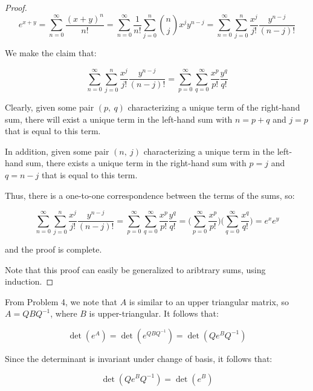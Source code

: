 \documentclass[10pt, oneside]{article}
\begin{document}
    \begin{proof}
      $$e^{x + y} = \displaystyle\sum_{n = 0}^{\infty} \frac{(x + y)^n}{n!} = \displaystyle\sum_{n = 0}^{\infty} \frac{1}{n!} \displaystyle\sum_{j = 0}^{n} {n \choose j} x^{j} y^{n - j} =
      \displaystyle\sum_{n = 0}^{\infty} \displaystyle\sum_{j = 0}^{n} \frac{x^j}{j!} \frac{y^{n - j}}{(n - j)!}$$

      We make the claim that:

      $$\displaystyle\sum_{n = 0}^{\infty} \displaystyle\sum_{j = 0}^{n} \frac{x^j}{j!} \frac{y^{n - j}}{(n - j)!} = \displaystyle\sum_{p = 0}^{\infty} \displaystyle\sum_{q = 0}^{\infty} \frac{x^p}{p!} \frac{y^q}{q!}$$

      Clearly, given some pair $(p, \ q)$ characterizing a unique term of the right-hand sum, there will exist a unique term in the left-hand sum with $n = p + q$ and $j = p$ that is equal to this term.
      \newline

      In addition, given some pair $(n, \ j)$ characterizing a unique term in the left-hand sum, there exists a unique term in the right-hand sum with $p = j$ and $q = n - j$ that is equal to this term.
      \newline

      Thus, there is a one-to-one correspondence between the terms of the sums, so:

      $$\displaystyle\sum_{n = 0}^{\infty} \displaystyle\sum_{j = 0}^{n} \frac{x^j}{j!} \frac{y^{n - j}}{(n - j)!} = \displaystyle\sum_{p = 0}^{\infty} \displaystyle\sum_{q = 0}^{\infty} \frac{x^p}{p!} \frac{y^q}{q!} =
      \Big( \displaystyle\sum_{p = 0}^{\infty} \frac{x^p}{p!} \Big) \Big( \displaystyle\sum_{q = 0}^{\infty} \frac{x^q}{q!} \Big) = e^{x} e^{y}$$

      and the proof is complete.
      \newline

      Note that this proof can easily be generalized to aribtrary sums, using induction.
      \end{proof}

    From Problem 4, we note that $A$ is similar to an upper triangular matrix, so $A = Q B Q^{-1}$, where $B$ is upper-triangular. It follows that:

    $$\det(e^A) = \det( e^{Q B Q^{-1}} ) = \det( Q e^B Q^{-1} )$$

    Since the determinant is invariant under change of basis, it follows that:

    $$\det(Q e^{B} Q^{-1}) = \det(e^{B})$$
\end{document}
